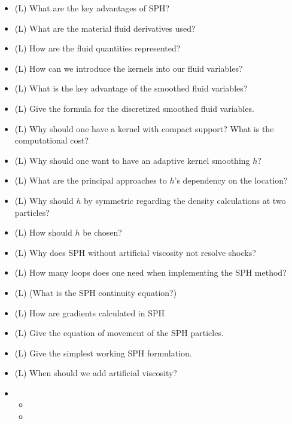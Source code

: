 \begin{itemize}
    \item (L) What are the key advantages of SPH?
    \answerboxM
    \item (L) What are the material fluid derivatives used?
    \answerboxM
    \item (L) How are the fluid quantities represented?
    \answerboxM
    \item (L) How can we introduce the kernels into our fluid variables?
    \answerboxM
    \item (L) What is the key advantage of the smoothed fluid variables?
    \answerboxS
    \item (L) Give the formula for the discretized smoothed fluid variables.
    \answerboxS
    \item (L) Why should one have a kernel with compact support? What is the computational cost?
    \answerboxS
    \item (L) Why should one want to have an adaptive kernel smoothing $h$?
    \answerboxM
    \item (L) What are the principal approaches to $h$'s dependency on the location?
    \answerboxM
    \item (L) Why should $h$ by symmetric regarding the density calculations at two particles?
    \answerboxM
    \item (L) How should $h$ be chosen?
    \answerboxM
    \item (L) Why does SPH without artificial viscosity not resolve shocks?
    \answerboxM
    \item (L) How many loops does one need when implementing the SPH method?
    \answerboxS
    \item (L) (What is the SPH continuity equation?)
    \answerboxS
    \item (L) How are gradients calculated in SPH
    \answerboxM
    \item (L) Give the equation of movement of the SPH particles.
    \answerboxM
    \item (L) Give the simplest working SPH formulation.
    \answerboxM
    \item (L) When should we add artificial viscosity?
    \item \begin{itemize}
        \item {}
        \item {}

\end{itemize}
\end{itemize}
